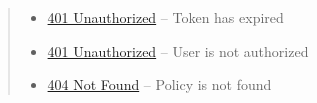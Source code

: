 \documentclass[letterpaper,10pt,english]{sphinxmanual}
\begin{document}
\begin{fulllineitems}
\begin{quote}
\begin{description}
\begin{itemize}
\item {} 
\href{http://www.w3.org/Protocols/rfc2616/rfc2616-sec10.html\#sec10.4.2}{401 Unauthorized} -- Token has expired

\item {} 
\href{http://www.w3.org/Protocols/rfc2616/rfc2616-sec10.html\#sec10.4.2}{401 Unauthorized} -- User is not authorized

\item {} 
\href{http://www.w3.org/Protocols/rfc2616/rfc2616-sec10.html\#sec10.4.5}{404 Not Found} -- Policy is not found

\end{itemize}

\end{description}\end{quote}

\end{fulllineitems}
\end{document}
